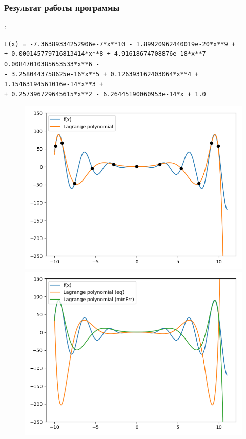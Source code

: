 \documentclass[12pt,a4paper]{article}
\begin{document}
\subsubsection{Результат работы программы}:
\begin{verbatim}
L(x) = -7.36389334252906e-7*x**10 - 1.89920962440019e-20*x**9 +
+ 0.000145779716813414*x**8 + 4.91618674708876e-18*x**7 - 0.00847010385653533*x**6 -
- 3.2580443758625e-16*x**5 + 0.126393162403064*x**4 + 1.15463194561016e-14*x**3 + 
+ 0.257396729645615*x**2 - 6.26445190060953e-14*x + 1.0
\end{verbatim}

\begin{figure}
\includegraphics[width=\linewidth]{L(f)2.png}
\caption{}
\label{fig:}
\includegraphics[width=\linewidth]{compar1.png}
\caption{}
\label{fig:}
\end{figure}\\
\end{document}
